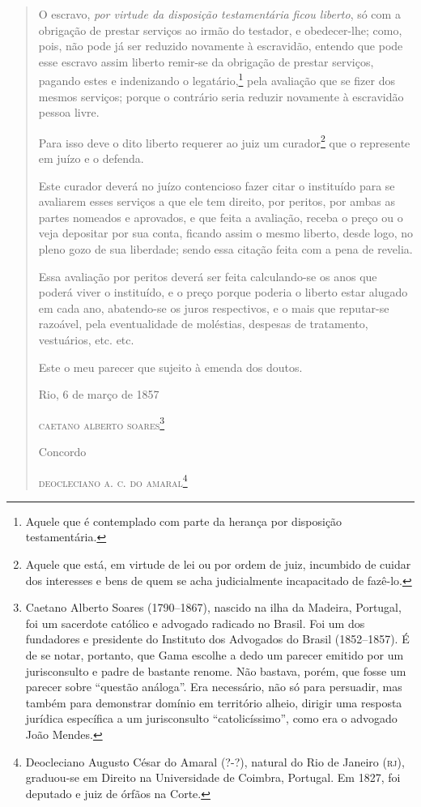 \begin{quote}
O escravo, \emph{por virtude da disposição testamentária ficou
liberto}, só com a obrigação de prestar serviços ao irmão do testador, e
obedecer-lhe; como, pois, não pode já ser reduzido novamente à
escravidão, entendo que pode esse escravo assim liberto remir-se da
obrigação de prestar serviços, pagando estes e indenizando o
legatário,\footnote{ Aquele que é contemplado com
  parte da herança por disposição testamentária.} pela avaliação que se
fizer dos mesmos serviços; porque o contrário seria reduzir novamente à
escravidão pessoa livre.

Para isso deve o dito liberto requerer ao juiz um curador\footnote{
  Aquele que está, em virtude de lei ou por ordem de juiz, incumbido de
  cuidar dos interesses e bens de quem se acha judicialmente
  incapacitado de fazê-lo.} que o represente em juízo e o defenda.

Este curador deverá no juízo contencioso fazer citar o instituído para
se avaliarem esses serviços a que ele tem direito, por peritos, por
ambas as partes nomeados e aprovados, e que feita a avaliação, receba o
preço ou o veja depositar por sua conta, ficando assim o mesmo liberto,
desde logo, no pleno gozo de sua liberdade; sendo essa citação feita com
a pena de revelia.

Essa avaliação por peritos deverá ser feita calculando-se os anos que
poderá viver o instituído, e o preço porque poderia o liberto estar
alugado em cada ano, abatendo-se os juros respectivos, e o mais que
reputar-se razoável, pela eventualidade de moléstias, despesas de
tratamento, vestuários, etc. etc.

Este o meu parecer que sujeito à emenda dos doutos.

\begin{flushright}
Rio, 6 de março de 1857

\textsc{caetano alberto soares}\footnote{ Caetano Alberto Soares
  (1790--1867), nascido na ilha da Madeira, Portugal, foi um sacerdote
  católico e advogado radicado no Brasil. Foi um dos fundadores e
  presidente do Instituto dos Advogados do Brasil (1852--1857). É de se
  notar, portanto, que Gama escolhe a dedo um parecer emitido por um
  jurisconsulto e padre de bastante renome. Não bastava, porém, que
  fosse um parecer sobre ``questão análoga''. Era necessário, não só
  para persuadir, mas também para demonstrar domínio em território
  alheio, dirigir uma resposta jurídica específica a um jurisconsulto
  ``catolicíssimo'', como era o advogado João Mendes.}
\end{flushright}

Concordo

\begin{flushright}
\textsc{deocleciano a. c. do amaral}\footnote{ Deocleciano Augusto César do
  Amaral (?-?), natural do Rio de Janeiro (\textsc{rj}), graduou-se em Direito na
  Universidade de Coimbra, Portugal. Em 1827, foi deputado e juiz de
  órfãos na Corte.}
\end{flushright}
\end{quote}

